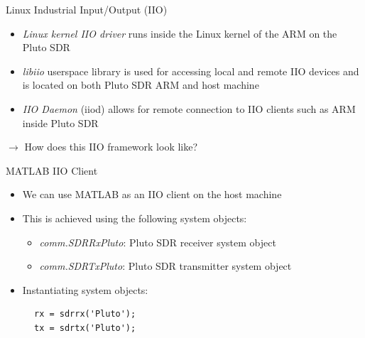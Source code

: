 \documentclass[10pt]{beamer}
\begin{document}

\begin{frame}[fragile]{Linux Industrial Input/Output (IIO)}


\begin{itemize}
 \item \textit{Linux kernel IIO driver} runs inside the Linux kernel of the ARM on the Pluto SDR
 \item \textit{libiio} userspace library is used for accessing local and remote IIO devices and is located on both Pluto SDR ARM and host machine
 \item \textit{IIO Daemon} (iiod) allows for remote connection to IIO clients such as ARM inside Pluto SDR
\end{itemize}
\vspace*{5mm}
$\rightarrow$ How does this IIO framework look like?

\end{frame}





\begin{frame}[fragile]{MATLAB IIO Client}

\begin{itemize}
 \item We can use MATLAB as an IIO client on the host machine
 \item This is achieved using the following system objects:
 \begin{itemize}
  \item \textit{comm.SDRRxPluto}: Pluto SDR receiver system object
  \item \textit{comm.SDRTxPluto}: Pluto SDR transmitter system object
 \end{itemize}
 \item Instantiating system objects:
\end{itemize}
\begin{figure}
\centering
\begin{minipage}[framed]{0.9\textwidth}
\begin{lstlisting}
rx = sdrrx('Pluto');
tx = sdrtx('Pluto');
\end{lstlisting}
\end{minipage}
\captionsetup{labelformat=empty}
\end{figure}

\end{frame}
\end{document}
